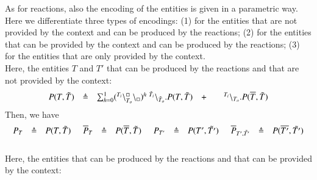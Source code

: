 As for reactions, also the encoding of the entities is given in a parametric way.
Here we differentiate three types of encodings: (1) for the entities that are not  provided by the context and  can be produced by the reactions; (2) for the entities that can be provided by the context and can be  produced by the reactions; (3) for the entities that are only provided by the context.\\
Here, the entities $T$ and $T'$ that can be produced by the reactions and that are not provided by the context:
\[
\begin{array}{lcllcl}
P (T,\tilde{T})&\triangleq & \sum_{h=0}^1 ({}^{T_i}\backslash_{T_o}^{\scriptstyle {\square}}\backslash_{\scriptstyle {\square}})^h\ {}^{\tilde{T}_i} \backslash_{\tilde{T}_o}.P (T,\tilde{T})
& +  && {}^{T_i} \backslash_{T_o}.P (\overline{T},\tilde{T}) \\
\end{array}
\]
Then, we have
\[
\begin{array}{lcl @{\hspace{0.5cm}}lcl @{\hspace{0.5cm}}lcl @{\hspace{0.5cm}}lcl}
P_T & \defeq & P(T,\tilde{T})& \overline{P}_T & \defeq & P(\overline{T},\tilde{T}) & P_{T'}& \defeq & P(T',\tilde{T'}) & \overline{P}_{T',\tilde{T'}}& \defeq & P(\overline{T'},\tilde{T'})\\\
\end{array}
\]
Here, the entities that can be produced by the reactions and that can be  provided by the context:
